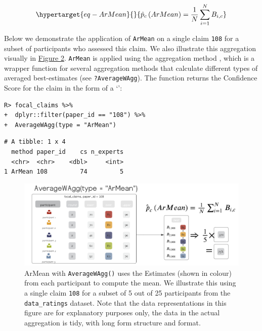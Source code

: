 \documentclass[article]{jss}
\newcommand{\class}[1]{`\code{#1}'}
\newcommand{\fct}[1]{\code{#1()}}
\begin{document}
\begin{equation}\protect\hypertarget{eq-ArMean}{}{
\hat{p}_c\left(ArMean \right ) = \frac{1}{N}\sum_{i=1}^N B_{i,c}
}\label{eq-ArMean}\end{equation}

Below we demonstrate the application of \texttt{ArMean} on a single
claim \texttt{108} for a subset of participants who assessed this claim.
We also illustrate this aggregation visually in
\protect\hyperlink{fig-ArMean}{Figure 2}. \texttt{ArMean} is applied
using the aggregation method \fct{AverageWAgg}, which is a wrapper
function for several aggregation methods that calculate different types
of averaged best-estimates (see \texttt{?AverageWAgg}). The function
returns the Confidence Score for the claim in the form of a
\class{tibble}:

\begin{verbatim}
R> focal_claims %>% 
+  dplyr::filter(paper_id == "108") %>%
+  AverageWAgg(type = "ArMean")
\end{verbatim}

\begin{verbatim}
# A tibble: 1 x 4
  method paper_id    cs n_experts
  <chr>  <chr>    <dbl>     <int>
1 ArMean 108         74         5
\end{verbatim}

\begin{figure}

{\centering \includegraphics[width=6.25in,height=\textheight]{images/ArMean.png}

}

\caption{\label{fig-ArMean}ArMean with \texttt{AverageWAgg()} uses the
Estimates (shown in colour) from each participant to compute the mean.
We illustrate this using a single claim \texttt{108} for a subset of 5
out of 25 participants from the \texttt{data\_ratings} dataset. Note
that the data representations in this figure are for explanatory
purposes only, the data in the actual aggregation is tidy, with long
form structure and format.}

\end{figure}
\end{document}
